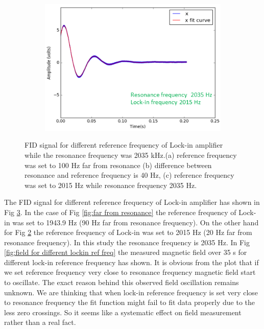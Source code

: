 \begin{figure}
\begin{subfigure}[b]{0.4\textwidth}
        \caption{}
        \label{fig: middle range}
    \end{subfigure}
    \begin{subfigure}[b]{0.4\textwidth}
        \centering
        \includegraphics[width=\textwidth]{figures/reference_frequency2}
        \caption{}
        \label{fig:close to resonance}
    \end{subfigure}
 \caption{FID signal for different reference frequency of Lock-in amplifier while the resonance frequency was 2035 kHz.(a) reference frequency was set to 100 Hz far from resonance (b) difference between resonance and reference frequency is 40 Hz, (c) reference frequency was set to 2015 Hz while resonance frequency 2035 Hz. \label{fig:different reference signal}}
\end{figure}
  
  The FID signal for different reference frequency of Lock-in amplifier has shown in Fig \ref{fig:different reference signal}. In the case of Fig \ref{fig:far from resonance} the reference frequency of Lock-in was set to 1943.9 Hz (90 Hz far from resonance frequency). On the other hand for Fig \ref{fig:close to resonance} the reference frequency of Lock-in was set to 2015 Hz (20 Hz far from resonance frequency). In this study the resonance frequency is 2035 Hz. In Fig \ref{fig:field for different lockin ref freq} the measured magnetic field over 35 s for different lock-in reference frequency has shown. It is obvious from the plot that if we set reference frequency very close to resonance frequency magnetic field start to oscillate. The exact reason behind this observed field oscillation remains unknown. We are thinking that when lock-in reference frequency is set very close to resonance frequency the fit function might fail to fit data properly due to the less zero crossings. So it seems like a systematic effect on field measurement rather than a real fact.
   
